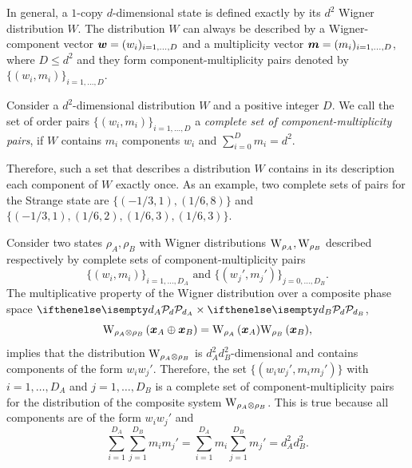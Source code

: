 \documentclass[pra,
aps,
twocolumn,
superscriptaddress,
groupedaddress,
nofootinbib,
reprint
]{revtex4-1}
\begin{document}
In general, a $1$-copy $d$-dimensional state is defined exactly by its $d^2$ Wigner distribution $W$. 
The distribution $W$ can always be described by a Wigner-component vector $\bm{w} = (w_i)_{i=1,\dots,D}$ and a multiplicity vector $\bm{m} = (m_i)_{i=1,\dots,D}$, where $D \leq d^2$ and they form component-multiplicity pairs denoted by $\{(w_i, m_i)\}_{i=1,\dots,D}$.
\begin{definition}
	Consider a $d^2$-dimensional distribution $W$ and a positive integer $D$. 
	We call the set of order pairs $\{(w_i, m_i)\}_{i=1,\dots,D}$ a \emph{complete set of component-multiplicity pairs}, if $W$ contains $m_i$ components $w_i$ and $\sum_{i=0}^D m_i = d^2$.
\end{definition}
Therefore, such a set that describes a distribution $W$ contains in its description each component of $W$ exactly once.
As an example, two complete sets of pairs for the Strange state are $\{( -1/3, 1), ( 1/6, 8)\}$ and $\{(-1/3, 1), (1/6, 2), (1/6, 3), (1/6, 3)\}$.

Consider two states $\rho_A, \rho_B$ with Wigner distributions $\W{\rho_A}, \W{\rho_B}$ described respectively by complete sets of component-multiplicity pairs 
\begin{equation}
	\{(w_i, m_i)\}_{i=1,\dots,D_A} \text{ and } \{(w_j', m_j')\}_{j=0,\dots,D_B}.
\end{equation}
The multiplicative property of the Wigner distribution over a composite phase space $\pd[d_A] \times \pd[d_B]$,
\begin{equation}
	\W[\bmx_A \oplus \bmx_B]{\rho_A \otimes \rho_B} = \W[\bmx_A]{\rho_A}\W[\bmx_B]{\rho_B},
\end{equation}
implies that the distribution $\W{\rho_A \otimes \rho_B}$ is $d_A^2 d_B^2$-dimensional and contains components of the form $w_i w_j'$. 
Therefore, the set $\{(w_i w_j', m_i m_j')\}$ with $i=1,\dots,D_A$ and $j=1,\dots,D_B$ is a complete set of component-multiplicity pairs for the distribution of the composite system $\W{\rho_A \otimes \rho_B}$.
This is true because all components are of the form $w_i w_j'$ and 
\begin{equation*}
	\sum_{i=1}^{D_A}\sum_{j=1}^{D_B} m_i m_j' = \sum_{i=1}^{D_A} m_i \sum_{j=1}^{D_B} m_j' = d_A^2 d_B^2.
\end{equation*}
\end{document}
